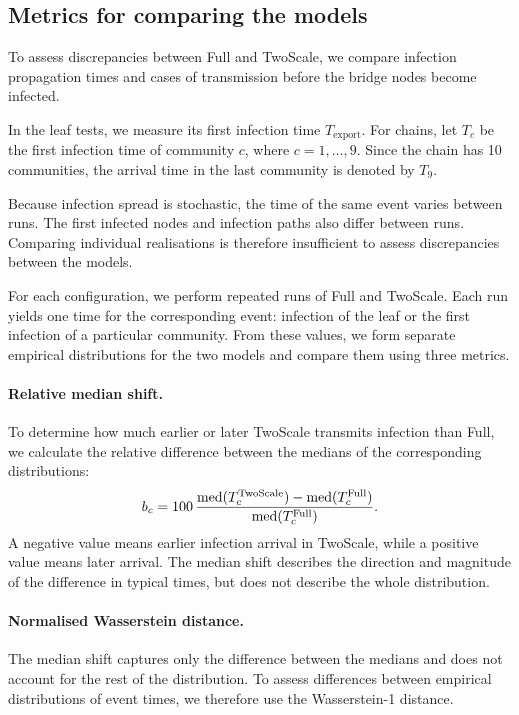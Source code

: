 \documentclass{ieeeaccess}
\newcommand{\Full}{\textup{Full}}
\newcommand{\TS}{\textup{TwoScale}}
\begin{document}
\subsection{Metrics for comparing the models}

To assess discrepancies between \Full{} and \TS{}, we compare infection propagation times and cases of transmission before the bridge nodes become infected.

In the leaf tests, we measure its first infection time $T_{\mathrm{export}}$. For chains, let $T_c$ be the first infection time of community $c$, where $c=1,\ldots,9$. Since the chain has 10 communities, the arrival time in the last community is denoted by $T_9$.

Because infection spread is stochastic, the time of the same event varies between runs. The first infected nodes and infection paths also differ between runs. Comparing individual realisations is therefore insufficient to assess discrepancies between the models.

For each configuration, we perform repeated runs of \Full{} and \TS{}. Each run yields one time for the corresponding event: infection of the leaf or the first infection of a particular community. From these values, we form separate empirical distributions for the two models and compare them using three metrics.

\paragraph{Relative median shift.}
To determine how much earlier or later \TS{} transmits infection than \Full{}, we calculate the relative difference between the medians of the corresponding distributions:
\[
b_c =
100\,
\frac{
\operatorname{med}(T_c^{\TS})-
\operatorname{med}(T_c^{\Full})
}{
\operatorname{med}(T_c^{\Full})
}.
\]
A negative value means earlier infection arrival in \TS{}, while a positive value means later arrival. The median shift describes the direction and magnitude of the difference in typical times, but does not describe the whole distribution.

\paragraph{Normalised Wasserstein distance.}
The median shift captures only the difference between the medians and does not account for the rest of the distribution. To assess differences between empirical distributions of event times, we therefore use the Wasserstein-1 distance.
\end{document}
